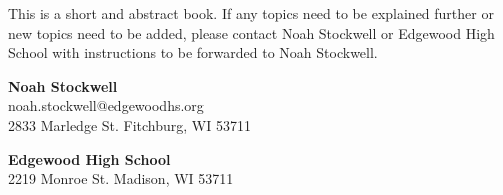 This is a short and abstract book. If any topics need to be explained further or new topics need to be added, please contact Noah Stockwell or Edgewood High School with instructions to be forwarded to Noah Stockwell.
\vfill
\par \textbf{Noah Stockwell}\\
noah.stockwell@edgewoodhs.org\\
2833 Marledge St. Fitchburg, WI 53711\\
\par \textbf{Edgewood High School}\\
2219 Monroe St. Madison, WI 53711